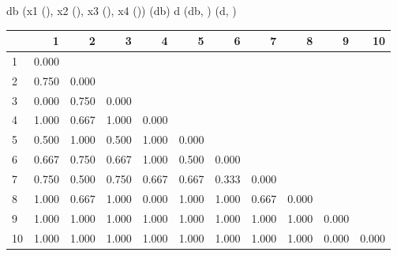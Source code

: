 \begin{code}
db \ROperator{<-} (x1 \ROperator{=} (), x2 \ROperator{=} (),
            x3 \ROperator{=} (), x4 \ROperator{=} ())
(db)                                
d \ROperator{<-} (db, )
(d, )
\end{code}
\par\addvspace{5pt}\begin{center}\begin{minipage}{\linewidth}\centering
\small
{}
\begin{tabular}{lrrrrrrrrrr}\toprule
 &{\bfseries  1 }&{\bfseries  2 }&{\bfseries  3 }&{\bfseries  4 }&{\bfseries  5 }&{\bfseries  6 }&{\bfseries  7 }&{\bfseries  8 }&{\bfseries  9 }&{\bfseries  10}\\\midrule
1 & 0.000 &  &  &  &  &  &  &  &  & \\
2 & 0.750 & 0.000 &  &  &  &  &  &  &  & \\
3 & 0.000 & 0.750 & 0.000 &  &  &  &  &  &  & \\
4 & 1.000 & 0.667 & 1.000 & 0.000 &  &  &  &  &  & \\
5 & 0.500 & 1.000 & 0.500 & 1.000 & 0.000 &  &  &  &  & \\
6 & 0.667 & 0.750 & 0.667 & 1.000 & 0.500 & 0.000 &  &  &  & \\
7 & 0.750 & 0.500 & 0.750 & 0.667 & 0.667 & 0.333 & 0.000 &  &  & \\
8 & 1.000 & 0.667 & 1.000 & 0.000 & 1.000 & 1.000 & 0.667 & 0.000 &  & \\
9 & 1.000 & 1.000 & 1.000 & 1.000 & 1.000 & 1.000 & 1.000 & 1.000 & 0.000 & \\
10 & 1.000 & 1.000 & 1.000 & 1.000 & 1.000 & 1.000 & 1.000 & 1.000 & 0.000 & 0.000\\
\bottomrule\end{tabular}
\end{minipage}\end{center}

